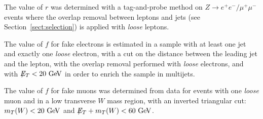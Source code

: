 The value of $r$ was determined with a tag-and-probe method on 
$Z \rightarrow e^+e^-/\mu^+\mu^-$ events where the overlap removal between leptons and jets (see 
Section~\ref{sect:selection}) is applied with {\it loose} leptons.

The value of $f$ for fake electrons is estimated in a sample with at least one jet and exactly one 
{\it loose} electron, 
with a cut on the distance between the leading jet and the lepton, with the overlap 
removal performed with {\it loose} electrons, and with $\met{}<20 \GeV$ in order to 
enrich the sample in multijets.

The value of $f$ for fake muons was determined from data for events with one {\it loose} muon and
in a low transverse $W$ mass region, with an 
inverted triangular cut: $m_T(W)<20 \GeV$ and $\met{}+m_T(W)<60 \GeV$. 








